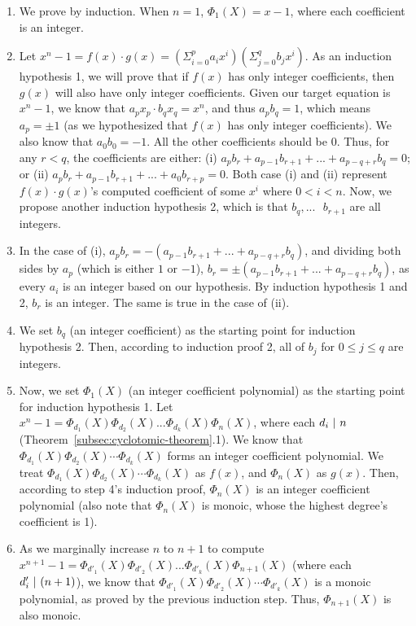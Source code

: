 \begin{myproof}
\begin{enumerate}
    \item We prove by induction. When $n=1$, $\Phi_1(X) = x - 1$, where each coefficient is an integer.
    \item Let $x^n - 1 = f(x) \cdot g(x) = (\Sigma_{i=0}^{p}a_ix^i)(\Sigma_{j=0}^{q}b_jx^i)$. As an induction hypothesis 1, we will prove that if $f(x)$ has only integer coefficients, then $g(x)$ will also have only integer coefficients. Given our target equation is $x^n - 1$, we know that $a_px_p \cdot b_qx_q = x^n$, and thus $a_pb_q = 1$, which means $a_p = \pm 1$ (as we hypothesized that $f(x)$ has only integer coefficients). We also know that $a_0b_0 = -1$. All the other coefficients should be 0. Thus, for any $r < q$, the coefficients are either: (i) $a_pb_{r} + a_{p-1}b_{r + 1} + ... + a_{p-q+r}b_{q} = 0$; or (ii) $a_pb_{r} + a_{p-1}b_{r + 1} + ... + a_{0}b_{r+p} = 0$. Both case (i) and (ii) represent $f(x)\cdot g(x)$'s computed coefficient of some $x^i$ where $0 < i < n$. Now, we propose another induction hypothesis 2, which is that $b_{q}, ... \text{ } b_{r+1}$ are all integers.
    \item In the case of (i), $a_pb_{r} = -(a_{p-1}b_{r + 1} + ... + a_{p-q+r}b_{q})$, and dividing both sides by $a_p$ (which is either $1$ or $-1$), $b_{r} = \pm(a_{p-1}b_{r + 1} + ... + a_{p-q+r}b_{q})$, as every $a_i$ is an integer based on our hypothesis. By induction hypothesis 1 and 2, $b_r$ is an integer. The same is true in the case of (ii). 
    \item We set $b_q$ (an integer coefficient) as the starting point for induction hypothesis 2. Then, according to induction proof 2, all of $b_j$ for $0 \leq j \leq q$ are integers.
    \item Now, we set $\Phi_1(X)$ (an integer coefficient polynomial) as the starting point for induction hypothesis 1. Let $x^n - 1 = \Phi_{d_1}(X)\Phi_{d_2}(X)...\Phi_{d_k}(X)\Phi_{n}(X)$, where each $d_i \text{ } \text{$|$} \text{ } n$ (Theorem~\ref*{subsec:cyclotomic-theorem}.1). We know that $\Phi_{d_1}(X)\Phi_{d_2}(X)\cdots\Phi_{d_k}(X)$ forms an integer coefficient polynomial. We treat $\Phi_{d_1}(X)\Phi_{d_2}(X)\cdots\Phi_{d_k}(X)$ as $f(x)$, and $\Phi_n(X)$ as $g(x)$.
    Then, according to step 4's induction proof, $\Phi_{n}(X)$ is an integer coefficient polynomial (also note that $\Phi_n(X)$ is monoic, whose the highest degree's coefficient is 1). 
    \item As we marginally increase $n$ to $n+1$ to compute $x^{n+1} - 1 = \Phi_{d'_1}(X)\Phi_{d'_2}(X)...\Phi_{d'_k}(X)\Phi_{n+1}(X)$ (where each $d'_i \text{ } \text{$|$} \text{ } (n+1)$), we know that $\Phi_{d'_1}(X)\Phi_{d'_2}(X)\cdots\Phi_{d'_k}(X)$ is a monoic polynomial, as proved by the previous induction step. Thus, $\Phi_{n+1}(X)$ is also monoic. 
\end{enumerate}
\end{myproof}
